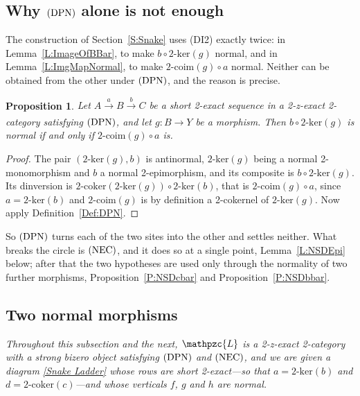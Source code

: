 \documentclass[reqno,a4paper]{amsart}
\numberwithin{equation}{section}
\theoremstyle{plain}
\newtheorem{proposition}[subsection]{Proposition}
\theoremstyle{definition}
\def\nameit#1{\textrm{#1}~}
\def\prox{\nameit{Proposition}}
\def\lemx{\nameit{Lemma}}
\def\defx{\nameit{Definition}}
\newcommand{\comp}{\circ}
\newcommand{\catfont}[1]{\ensuremath{\mathpzc{#1}}\xspace}
\def\L{\catfont{L}}
\renewcommand{\1}{\onecat{1}}
\newcommand{\DPN}{\textup{(DPN)}}
\newcommand{\NEC}{\textup{(NEC)}}
\newcommand{\twoker}{\ensuremath{2\text{-}\mathrm{ker}}}
\newcommand{\twocoker}{\ensuremath{2\text{-}\mathrm{coker}}}
\newcommand{\twocoim}{\ensuremath{2\text{-}\mathrm{coim}}}
\newcommand{\aar}[2][]{\xrightarrow[#1]{#2}}
\begin{document}
\subsection{Why \texorpdfstring{\(\DPN\)}{(DPN)} alone is not enough}\label{SS:NSDCircular}

The construction of Section~\ref{S:Snake} uses \textup{(DI2)} exactly twice: in \lemx\ref{L:ImageOfBBar}, to make \(b\comp\twoker(g)\) normal, and in \lemx\ref{L:ImgMapNormal}, to make \(\twocoim(g)\comp a\) normal. Neither can be obtained from the other under \(\DPN\), and the reason is precise.

\begin{proposition}\label{P:TwoSites}
	Let \(A\aar{a}B\aar{b}C\) be a short 2-exact sequence in a 2-z-exact 2-category satisfying \(\DPN\), and let \(g\colon B\to Y\) be a morphism. Then \(b\comp\twoker(g)\) is normal if and only if \(\twocoim(g)\comp a\) is.
\end{proposition}
\begin{proof}
	The pair \((\twoker(g),b)\) is antinormal, \(\twoker(g)\) being a normal 2-monomorphism and \(b\) a normal 2-epimorphism, and its composite is \(b\comp\twoker(g)\). Its dinversion is \(\twocoker(\twoker(g))\comp\twoker(b)\), that is \(\twocoim(g)\comp a\), since \(a=\twoker(b)\) and \(\twocoim(g)\) is by definition a 2-cokernel of \(\twoker(g)\). Now apply \defx\ref{Def:DPN}.
\end{proof}

So \(\DPN\) turns each of the two sites into the other and settles neither. What breaks the circle is \(\NEC\), and it does so at a single point, \lemx\ref{L:NSDEpi} below; after that the two hypotheses are used only through the normality of two further morphisms, \prox\ref{P:NSDcbar} and \prox\ref{P:NSDbbar}.

\subsection{Two normal morphisms}\label{SS:NSDNormal}

\emph{Throughout this subsection and the next, \(\L\) is a 2-z-exact 2-category with a strong bizero object satisfying \(\DPN\) and \(\NEC\), and we are given a diagram \eqref{Snake Ladder} whose rows are short 2-exact---so that \(a=\twoker(b)\) and \(d=\twocoker(c)\)---and whose verticals \(f\), \(g\) and \(h\) are normal.}
\end{document}

